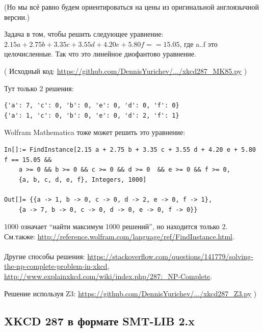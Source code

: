 (Но мы всё равно будем ориентироваться на цены из оригинальной англоязычной версии.)

Задача в том, чтобы решить следующее уравнение:
$2.15a + 2.75b + 3.35c + 3.55d + 4.20e + 5.80f == 15.05$,
где a..f это целочисленные.
Так что это линейное диофантово уравнение.



( Исходный код: \url{https://github.com/DennisYurichev/.../xkcd287_MK85.py} )

Тут только 2 решения:

\begin{lstlisting}
{'a': 7, 'c': 0, 'b': 0, 'e': 0, 'd': 0, 'f': 0}
{'a': 1, 'c': 0, 'b': 0, 'e': 0, 'd': 2, 'f': 1}
\end{lstlisting}

Wolfram Mathematica тоже может решить это уравнение:

\begin{lstlisting}
In[]:= FindInstance[2.15 a + 2.75 b + 3.35 c + 3.55 d + 4.20 e + 5.80 f == 15.05 && 
	a >= 0 && b >= 0 && c >= 0 && d >= 0  && e >= 0 && f >= 0, 
	{a, b, c, d, e, f}, Integers, 1000]

Out[]= {{a -> 1, b -> 0, c -> 0, d -> 2, e -> 0, f -> 1},
	{a -> 7, b -> 0, c -> 0, d -> 0, e -> 0, f -> 0}}
\end{lstlisting}

1000 означает ``найти максимум 1000 решений'', но находится только 2.
См.также: \url{http://reference.wolfram.com/language/ref/FindInstance.html}.\\
\\
Другие способы решения:
\url{https://stackoverflow.com/questions/141779/solving-the-np-complete-problem-in-xkcd},
\url{http://www.explainxkcd.com/wiki/index.php/287:_NP-Complete}.

Решение используя Z3: \url{https://github.com/DennisYurichev/.../xkcd287_Z3.py} )

\subsection{XKCD 287 в формате SMT-LIB 2.x}



